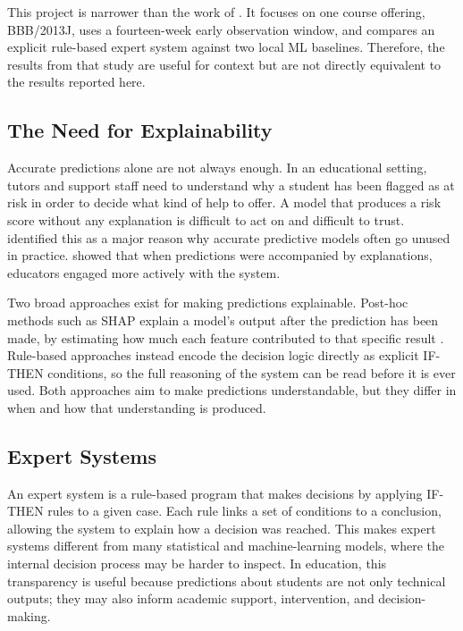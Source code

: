 This project is narrower than the work of \textcite{ujkani2024oulad}. It focuses on one course offering, BBB/2013J, uses a fourteen-week early observation window, and compares an explicit rule-based expert system against two local ML baselines. Therefore, the results from that study are useful for context but are not directly equivalent to the results reported here.

\subsection{The Need for Explainability}

Accurate predictions alone are not always enough. In an educational setting, tutors and support staff need to understand why a student has been flagged as at risk in order to decide what kind of help to offer. A model that produces a risk score without any explanation is difficult to act on and difficult to trust. \textcite{khosravi2022explainable} identified this as a major reason why accurate predictive models often go unused in practice. \textcite{shabaninejad2022explanations} showed that when predictions were accompanied by explanations, educators engaged more actively with the system.

Two broad approaches exist for making predictions explainable. Post-hoc methods such as SHAP explain a model's output after the prediction has been made, by estimating how much each feature contributed to that specific result \parencite{lundberg2017unified}. Rule-based approaches instead encode the decision logic directly as explicit IF-THEN conditions, so the full reasoning of the system can be read before it is ever used. Both approaches aim to make predictions understandable, but they differ in when and how that understanding is produced.

\subsection{Expert Systems}

An expert system is a rule-based program that makes decisions by applying IF-THEN rules to a given case. Each rule links a set of conditions to a conclusion, allowing the system to explain how a decision was reached. This makes expert systems different from many statistical and machine-learning models, where the internal decision process may be harder to inspect. In education, this transparency is useful because predictions about students are not only technical outputs; they may also inform academic support, intervention, and decision-making.
